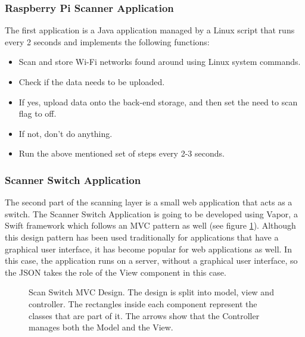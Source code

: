 \subsubsection{Raspberry Pi Scanner Application}
The first application is a Java application managed by a Linux script that runs every 2 seconds and implements the following functions:
\begin{itemize}
    \item Scan and store Wi-Fi networks found around using Linux system commands.
    \item Check if the data needs to be uploaded.
    \item If yes, upload data onto the back-end storage, and then set the need to scan flag to off.
    \item If not, don't do anything.
    \item Run the above mentioned set of steps every 2-3 seconds.
\end{itemize}

\subsubsection{Scanner Switch Application}

The second part of the scanning layer is a small web application that acts as a switch. The Scanner Switch Application is going to be developed using Vapor, a Swift framework which follows an MVC pattern as well (see figure \ref{fig:scan-switch-mvc}). Although this design pattern has been used traditionally for applications that have a graphical user interface, it has become popular for web applications as well. In this case, the application runs on a server, without a graphical user interface, so the JSON takes the role of the View component in this case.

\begin{figure}[H]
    \centering
    \centering
    \caption{Scan Switch MVC Design. The design is split into model, view and controller. The rectangles inside each component represent the classes that are part of it. The arrows show that the Controller manages both the Model and the View.}
\label{fig:scan-switch-mvc}
\end{figure}

